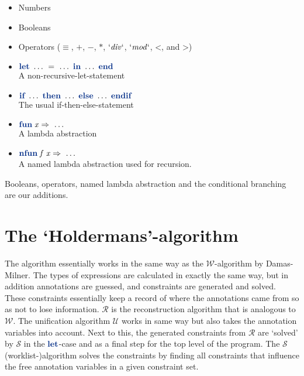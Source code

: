 \documentclass[a4paper,11pt]{article}
\newcommand{\hKeyword}[1]{\textbf{\color{steelblue}{#1}}}
\newcommand{\Varid}[1]{\mathit{#1}}
\begin{document}
\begin{itemize}
  \item Numbers
  \item Booleans
  \item Operators (\ensuremath{\equiv }, \ensuremath{\mathbin{+}}, \ensuremath{\mathbin{-}}, \ensuremath{\mathbin{*}}, \ensuremath{\mathbin{\Varid{`div`}}}, \ensuremath{\mathbin{\Varid{`mod`}}}, \ensuremath{\mathbin{<}}, and \ensuremath{\mathbin{>}})
  \item \ensuremath{\hKeyword{let}\ \dots\ \mathrel{=}\ \dots\ \hKeyword{in}\ \dots\ \hKeyword{end}}\\
        A non-recursive-let-statement
  \item \ensuremath{\hKeyword{if}\ \dots\ \hKeyword{then}\ \dots\ \hKeyword{else}\ \dots\ \hKeyword{endif}}\\
        The usual if-then-else-statement
  \item \ensuremath{\hKeyword{fun}\;\Varid{x}\Rightarrow \ \dots\ }\\
        A lambda abstraction
  \item \ensuremath{\hKeyword{nfun}\;\Varid{f}\;\Varid{x}\Rightarrow \ \dots\ }\\ 
        A named lambda abstraction used for recursion.
\end{itemize}

  Booleans, operators, named lambda abstraction and the conditional branching
  are our additions.
  
\section{The `Holdermans'-algorithm}

  The algorithm essentially works in the same way as the
  $\mathcal{W}$-algorithm by Damas-Milner. The types of expressions are
  calculated in exactly the same way, but in addition annotations are guessed,
  and constraints are generated and solved. These constraints essentially keep
  a record of where the annotations came from so as not to lose information.
  $\mathcal{R}$ is the reconstruction algorithm that is analogous to
  $\mathcal{W}$. The unification algorithm $\mathcal{U}$ works in same way but
  also takes the annotation variables into account. Next to this, the
  generated constraints from $\mathcal{R}$ are `solved' by $\mathcal{S}$ in
  the \ensuremath{\hKeyword{let}}-case and as a final step for the top level of the program. The
  $\mathcal{S}$ (worklist-)algorithm solves the constraints by finding all
  constraints that influence the free annotation variables in a given
  constraint set.
\end{document}
